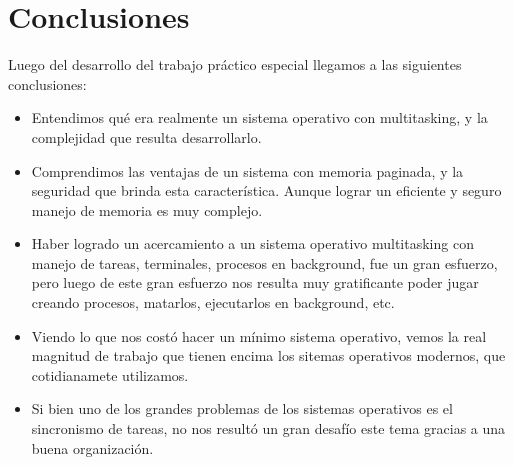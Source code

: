 \documentclass[a4paper,10pt]{article}
\begin{document}
\newpage
\section{Conclusiones}
Luego del desarrollo del trabajo práctico especial llegamos a las siguientes conclusiones:
\begin{itemize}
 \item Entendimos qué era realmente un sistema operativo con multitasking, y la complejidad que resulta desarrollarlo.
 \item Comprendimos las ventajas de un sistema con memoria paginada, y la seguridad que brinda esta característica. Aunque
    lograr un eficiente y seguro manejo de memoria es muy complejo.
 \item Haber logrado un acercamiento a un sistema operativo multitasking con manejo de tareas, terminales, procesos en background, fue un gran
      esfuerzo, pero luego de este gran esfuerzo nos resulta muy gratificante poder jugar creando procesos, matarlos, ejecutarlos en background, etc.
 \item Viendo lo que nos costó hacer un mínimo sistema operativo, vemos la real magnitud de trabajo que tienen encima los sitemas operativos modernos,
      que cotidianamete utilizamos.

 \item Si bien uno de los grandes problemas de los sistemas operativos es el sincronismo de tareas, no nos resultó un gran desafío
      este tema gracias a una buena organización.
\end{itemize}

\bigskip
\end{document}
